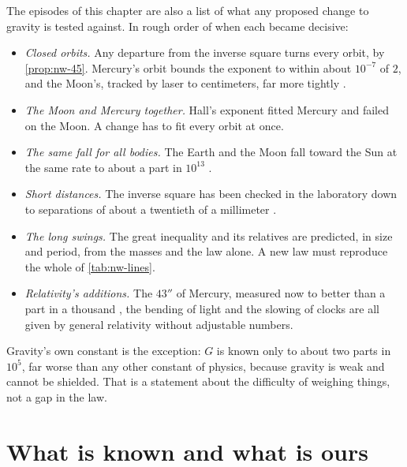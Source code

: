 The episodes of this chapter are also a list of what any proposed change to gravity is tested against. In rough order of when each became decisive:
\begin{itemize}
\item \emph{Closed orbits.} Any departure from the inverse square turns every orbit, by \cref{prop:nw-45}. Mercury's orbit bounds the exponent to within about $10^{-7}$ of $2$, and the Moon's, tracked by laser to centimeters, far more tightly \citep{Williams2004}.
\item \emph{The Moon and Mercury together.} Hall's exponent fitted Mercury and failed on the Moon. A change has to fit every orbit at once.
\item \emph{The same fall for all bodies.} The Earth and the Moon fall toward the Sun at the same rate to about a part in $10^{13}$ \citep{Williams2004}.
\item \emph{Short distances.} The inverse square has been checked in the laboratory down to separations of about a twentieth of a millimeter \citep{Kapner2007}.
\item \emph{The long swings.} The great inequality and its relatives are predicted, in size and period, from the masses and the law alone. A new law must reproduce the whole of \cref{tab:nw-lines}.
\item \emph{Relativity's additions.} The $43''$ of Mercury, measured now to better than a part in a thousand \citep{Park2017}, the bending of light and the slowing of clocks are all given by general relativity without adjustable numbers.
\end{itemize}
Gravity's own constant is the exception: $G$ is known only to about two parts in $10^5$, far worse than any other constant of physics, because gravity is weak and cannot be shielded. That is a statement about the difficulty of weighing things, not a gap in the law.

\section{What is known and what is ours}\label{sec:nw-audit}

